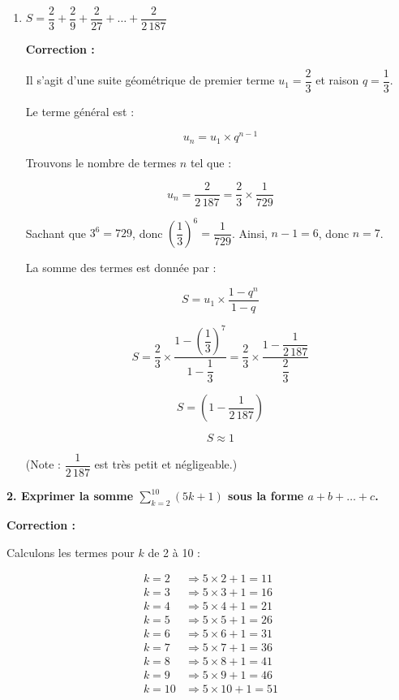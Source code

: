 \documentclass{article}
\begin{document}
\begin{enumerate}[label=\alph*)]
\[ S = 1 \times \dfrac{1 - \left( \dfrac{1}{4} \right)^{8}}{1 - \dfrac{1}{4}} = \dfrac{1 - \dfrac{1}{4^8}}{\dfrac{3}{4}} = \dfrac{4}{3} \left( 1 - \dfrac{1}{65\,536} \right) \]

\[ S \approx \dfrac{4}{3} \left( 1 - 0 \right) = \dfrac{4}{3} \]

(Note : \( \dfrac{1}{65\,536} \) est très petit et négligeable.)

\bigskip

\item \( S = \dfrac{2}{3} + \dfrac{2}{9} + \dfrac{2}{27} + \dots + \dfrac{2}{2\,187} \)

\textbf{Correction :}

Il s'agit d'une suite géométrique de premier terme \( u_1 = \dfrac{2}{3} \) et raison \( q = \dfrac{1}{3} \).

Le terme général est :

\[ u_n = u_1 \times q^{n - 1} \]

Trouvons le nombre de termes \( n \) tel que :

\[ u_n = \dfrac{2}{2\,187} = \dfrac{2}{3} \times \dfrac{1}{729} \]

Sachant que \( 3^6 = 729 \), donc \( \left( \dfrac{1}{3} \right)^{6} = \dfrac{1}{729} \). Ainsi, \( n - 1 = 6 \), donc \( n = 7 \).

La somme des termes est donnée par :

\[ S = u_1 \times \dfrac{1 - q^{n}}{1 - q} \]

\[ S = \dfrac{2}{3} \times \dfrac{1 - \left( \dfrac{1}{3} \right)^{7}}{1 - \dfrac{1}{3}} = \dfrac{2}{3} \times \dfrac{1 - \dfrac{1}{2\,187}}{\dfrac{2}{3}} \]

\[ S = \left( 1 - \dfrac{1}{2\,187} \right) \]

\[ S \approx 1 \]

(Note : \( \dfrac{1}{2\,187} \) est très petit et négligeable.)

\end{enumerate}

\bigskip

\textbf{2. Exprimer la somme \( \displaystyle \sum_{k=2}^{10} (5k + 1) \) sous la forme \( a + b + \dots + c \).}

\textbf{Correction :}

Calculons les termes pour \( k \) de 2 à 10 :

\begin{align*}
k = 2 &\Rightarrow 5 \times 2 + 1 = 11 \\
k = 3 &\Rightarrow 5 \times 3 + 1 = 16 \\
k = 4 &\Rightarrow 5 \times 4 + 1 = 21 \\
k = 5 &\Rightarrow 5 \times 5 + 1 = 26 \\
k = 6 &\Rightarrow 5 \times 6 + 1 = 31 \\
k = 7 &\Rightarrow 5 \times 7 + 1 = 36 \\
k = 8 &\Rightarrow 5 \times 8 + 1 = 41 \\
k = 9 &\Rightarrow 5 \times 9 + 1 = 46 \\
k = 10 &\Rightarrow 5 \times 10 + 1 = 51 \\
\end{align*}
\end{document}
